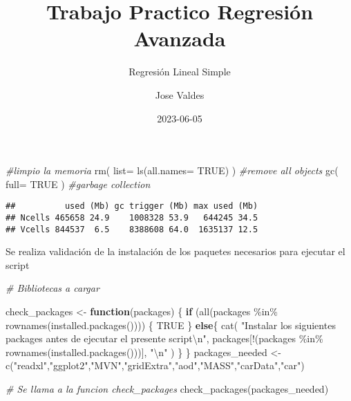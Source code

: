 \documentclass[
]{article}
\title{Trabajo Practico Regresión Avanzada}
\subtitle{Regresión Lineal Simple}
\author{Jose Valdes}
\date{2023-06-05}
\newenvironment{Shaded}{\begin{snugshade}}{\end{snugshade}}
\newcommand{\AttributeTok}[1]{\textcolor[rgb]{0.77,0.63,0.00}{#1}}
\newcommand{\CommentTok}[1]{\textcolor[rgb]{0.56,0.35,0.01}{\textit{#1}}}
\newcommand{\ConstantTok}[1]{\textcolor[rgb]{0.00,0.00,0.00}{#1}}
\newcommand{\ControlFlowTok}[1]{\textcolor[rgb]{0.13,0.29,0.53}{\textbf{#1}}}
\newcommand{\FunctionTok}[1]{\textcolor[rgb]{0.00,0.00,0.00}{#1}}
\newcommand{\NormalTok}[1]{#1}
\newcommand{\OtherTok}[1]{\textcolor[rgb]{0.56,0.35,0.01}{#1}}
\newcommand{\SpecialCharTok}[1]{\textcolor[rgb]{0.00,0.00,0.00}{#1}}
\newcommand{\StringTok}[1]{\textcolor[rgb]{0.31,0.60,0.02}{#1}}
\begin{document}
\maketitle

{
\setcounter{tocdepth}{5}
\tableofcontents
}
\begin{Shaded}
\begin{Highlighting}[]
\CommentTok{\#limpio la memoria}
\FunctionTok{rm}\NormalTok{( }\AttributeTok{list=} \FunctionTok{ls}\NormalTok{(}\AttributeTok{all.names=} \ConstantTok{TRUE}\NormalTok{) )  }\CommentTok{\#remove all objects}
\FunctionTok{gc}\NormalTok{( }\AttributeTok{full=} \ConstantTok{TRUE}\NormalTok{ )                 }\CommentTok{\#garbage collection}
\end{Highlighting}
\end{Shaded}

\begin{verbatim}
##          used (Mb) gc trigger (Mb) max used (Mb)
## Ncells 465658 24.9    1008328 53.9   644245 34.5
## Vcells 844537  6.5    8388608 64.0  1635137 12.5
\end{verbatim}

Se realiza validación de la instalación de los paquetes necesarios para
ejecutar el script

\begin{Shaded}
\begin{Highlighting}[]
\CommentTok{\# Bibliotecas a cargar}

\NormalTok{check\_packages }\OtherTok{\textless{}{-}} \ControlFlowTok{function}\NormalTok{(packages) \{}
  \ControlFlowTok{if}\NormalTok{ (}\FunctionTok{all}\NormalTok{(packages }\SpecialCharTok{\%in\%} \FunctionTok{rownames}\NormalTok{(}\FunctionTok{installed.packages}\NormalTok{()))) \{}
    \ConstantTok{TRUE}
\NormalTok{  \} }\ControlFlowTok{else}\NormalTok{\{}
    \FunctionTok{cat}\NormalTok{(}
      \StringTok{"Instalar los siguientes packages antes de ejecutar el presente script}\SpecialCharTok{\textbackslash{}n}\StringTok{"}\NormalTok{,}
\NormalTok{      packages[}\SpecialCharTok{!}\NormalTok{(packages }\SpecialCharTok{\%in\%} \FunctionTok{rownames}\NormalTok{(}\FunctionTok{installed.packages}\NormalTok{()))],}
      \StringTok{"}\SpecialCharTok{\textbackslash{}n}\StringTok{"}
\NormalTok{    )}
\NormalTok{  \}}
\NormalTok{\}}
\NormalTok{packages\_needed }\OtherTok{\textless{}{-}} \FunctionTok{c}\NormalTok{(}\StringTok{"readxl"}\NormalTok{,}\StringTok{"ggplot2"}\NormalTok{,}\StringTok{"MVN"}\NormalTok{,}\StringTok{"gridExtra"}\NormalTok{,}\StringTok{"aod"}\NormalTok{,}\StringTok{"MASS"}\NormalTok{,}\StringTok{"carData"}\NormalTok{,}\StringTok{"car"}\NormalTok{)}

\CommentTok{\# Se llama a la funcion check\_packages}
\FunctionTok{check\_packages}\NormalTok{(packages\_needed)}
\end{Highlighting}
\end{Shaded}
\end{document}
